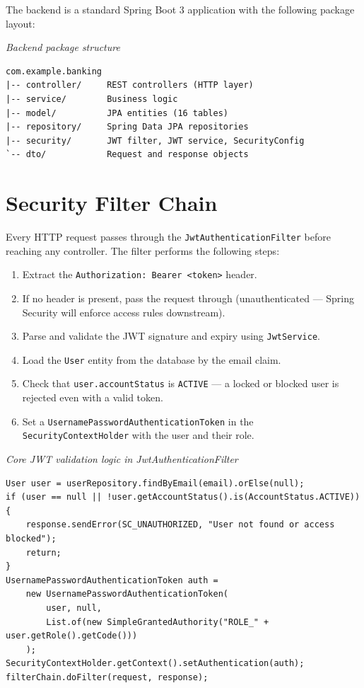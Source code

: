 \documentclass[12pt,a4paper]{report}
\begin{document}
The backend is a standard Spring Boot 3 application with the following package layout:


\textit{\small Backend package structure}\vspace{2pt}
\begin{Verbatim}[frame=single,fontsize=\small,bgcolor=codegray]
com.example.banking
|-- controller/     REST controllers (HTTP layer)
|-- service/        Business logic
|-- model/          JPA entities (16 tables)
|-- repository/     Spring Data JPA repositories
|-- security/       JWT filter, JWT service, SecurityConfig
`-- dto/            Request and response objects
\end{Verbatim}


\section{Security Filter Chain}

Every HTTP request passes through the \texttt{JwtAuthenticationFilter} before
reaching any controller. The filter performs the following steps:

\begin{enumerate}
  \item Extract the \texttt{Authorization: Bearer <token>} header.
  \item If no header is present, pass the request through (unauthenticated — Spring
        Security will enforce access rules downstream).
  \item Parse and validate the JWT signature and expiry using \texttt{JwtService}.
  \item Load the \texttt{User} entity from the database by the email claim.
  \item Check that \texttt{user.accountStatus} is \texttt{ACTIVE} — a locked or
        blocked user is rejected even with a valid token.
  \item Set a \texttt{UsernamePasswordAuthenticationToken} in the
        \texttt{SecurityContextHolder} with the user and their role.
\end{enumerate}


\textit{\small Core JWT validation logic in JwtAuthenticationFilter}\vspace{2pt}
\begin{Verbatim}[frame=single,fontsize=\small,bgcolor=codegray]
User user = userRepository.findByEmail(email).orElse(null);
if (user == null || !user.getAccountStatus().is(AccountStatus.ACTIVE)) {
    response.sendError(SC_UNAUTHORIZED, "User not found or access blocked");
    return;
}
UsernamePasswordAuthenticationToken auth =
    new UsernamePasswordAuthenticationToken(
        user, null,
        List.of(new SimpleGrantedAuthority("ROLE_" + user.getRole().getCode()))
    );
SecurityContextHolder.getContext().setAuthentication(auth);
filterChain.doFilter(request, response);
\end{Verbatim}
\end{document}
